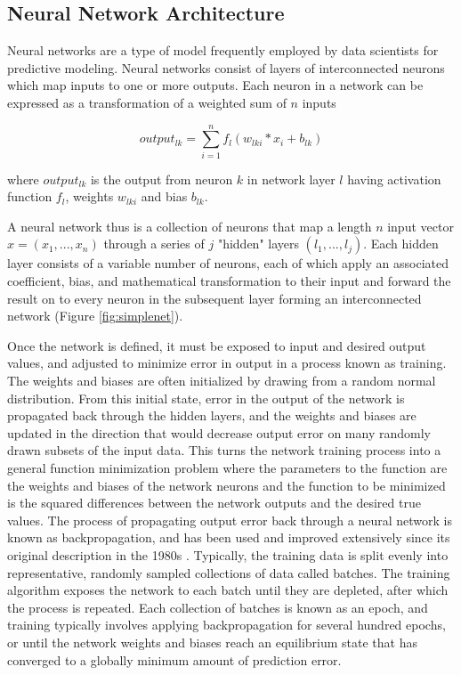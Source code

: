 \subsection*{Neural Network Architecture} \label{ssec:neuralnets}

Neural networks are a type of model frequently employed by data scientists
for predictive modeling. Neural networks consist of layers of interconnected neurons
which map inputs to one or more outputs. Each neuron in a network can be expressed as a 
transformation of a weighted sum of $n$ inputs 

\begin{equation}
output_{lk} = \sum_{i=1}^{n} f_l(w_{lki} * x_{i} + b_{lk})
\label{eq:neuron}
\end{equation}

where $output_{lk}$ is the output from neuron $k$ in network layer $l$ having activation
function $f_l$, weights $w_{lki}$ and bias $b_{lk}$.

A neural network thus is a collection of neurons that map a 
length $n$ input vector $x = (x_1, ..., x_n)$ through a series of $j$ 
"hidden" layers $(l_1, ..., l_j)$. Each hidden layer consists of a variable 
number of neurons, each of which apply an associated coefficient, bias, and 
mathematical transformation to their input and forward the 
result on to every neuron in the subsequent layer forming an interconnected
network (Figure \ref{fig:simplenet}).

\ifdefined\showtablesandfigures
\fi

Once the network is defined, it must be exposed to input and desired output
values, and adjusted to minimize error in output in a process known as training.
The weights and biases are often initialized by drawing from a
random normal distribution. From this initial state, error in 
the output of the network is propagated back through the hidden 
layers, and the weights and biases are updated in the direction that would 
decrease output error on many randomly drawn subsets of the input data. 
This turns the network training process into a general 
function minimization problem where the parameters to the function are the 
weights and biases of the network neurons and the function to be 
minimized is the squared differences between the network outputs and 
the desired true values. The process of propagating output error back 
through a neural network is known as backpropagation, and has been used 
and improved extensively since its original description in the 
1980s \citep{rumelhart1986}.  Typically, the training data is split 
evenly into representative, randomly sampled collections of data 
called batches. The training algorithm exposes the network to each 
batch until they are depleted, after which the process is repeated. Each 
collection of batches is known as an epoch, and training typically
involves applying backpropagation for several hundred epochs, or until the network
weights and biases reach an equilibrium state that has converged to a 
globally minimum amount of prediction error.

